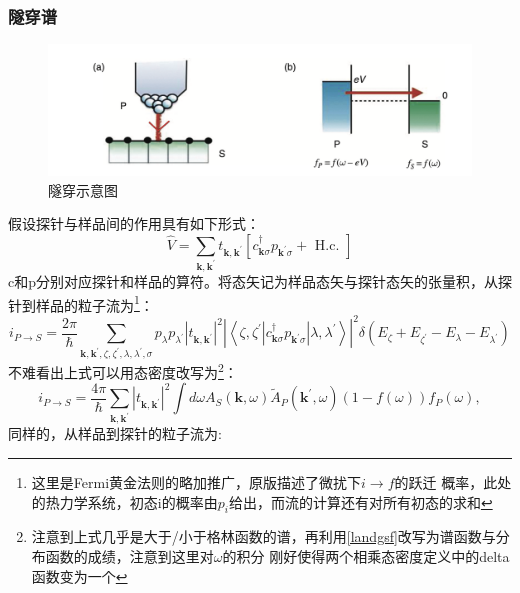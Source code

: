 \documentclass[10pt,openany]{book}
\theoremstyle{thmstyle} %
\theoremstyle{defstyle} %
\theoremstyle{prostyle} %
\begin{document}
\subsubsection{隧穿谱}
\begin{figure}[htbp]
	\centering
	\includegraphics*[scale=0.7]{Tunneling.png}
	\caption{隧穿示意图}
\end{figure}
假设探针与样品间的作用具有如下形式：
\begin{equation}
	\hat{V}=\sum_{\mathbf{k}, \mathbf{k}^{\prime}} t_{\mathbf{k}, \mathbf{k}^{\prime}}\left[c_{\mathbf{k} \sigma}^{\dagger} p_{\mathbf{k}^{\prime} \sigma}+\text { H.c. }\right]
\end{equation}
c和p分别对应探针和样品的算符。将态矢记为样品态矢与探针态矢的张量积，从探针到样品的粒子流为\footnote{这里是Fermi黄金法则的略加推广，原版描述了微扰下$ i\to f $的跃迁
概率，此处的热力学系统，初态i的概率由$ p_i $给出，而流的计算还有对所有初态的求和  }：
\begin{equation}
	i_{P \rightarrow S}=\frac{2 \pi}{\hbar} \sum_{\mathbf{k}, \mathbf{k}^{\prime}, \zeta, \zeta^{\prime}, \lambda, \lambda^{\prime}, \sigma} p_\lambda p_{\lambda^{\prime}}\left|t_{\mathbf{k}, \mathbf{k}^{\prime}}\right|^2\left|\left\langle\zeta, \zeta^{\prime}\left|c_{\mathbf{k} \sigma}^{\dagger} p_{\mathbf{k}^{\prime} \sigma}\right| \lambda, \lambda^{\prime}\right\rangle\right|^2 \delta\left(E_\zeta+E_{\zeta^{\prime}}-E_\lambda-E_{\lambda^{\prime}}\right)
\end{equation}
不难看出上式可以用态密度改写为\footnote{注意到上式几乎是大于/小于格林函数的谱，再利用\eqref{landgsf}改写为谱函数与分布函数的成绩，注意到这里对$ \omega $的积分
刚好使得两个相乘态密度定义中的delta函数变为一个 }：
\begin{equation}
	i_{P \rightarrow S}=\frac{4 \pi}{\hbar} \sum_{\mathbf{k}, \mathbf{k}^{\prime}}\left|t_{\mathbf{k}, \mathbf{k}^{\prime}}\right|^2 \int d \omega A_S(\mathbf{k}, \omega) \tilde{A}_P\left(\mathbf{k}^{\prime}, \omega\right)(1-f(\omega)) f_P(\omega),
\end{equation}
同样的，从样品到探针的粒子流为:
\end{document}
